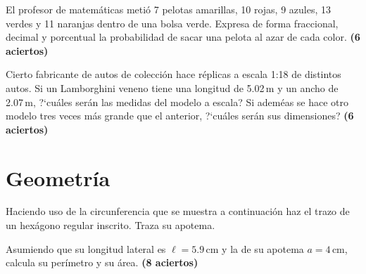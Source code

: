 \documentclass[11pt]{article}
\begin{document}
\vspace{3mm}

\newpage
\vspace{3mm}
El profesor de matem\'aticas meti\'o 7 pelotas amarillas, 10 rojas, 9 azules,
13 verdes y 11 naranjas dentro de una bolsa verde. Expresa de forma
fraccional, decimal y porcentual la probabilidad de sacar una pelota al azar de
cada color.
\hfill \textbf{(6 aciertos)}

\vspace{5cm}
Cierto fabricante de autos de colecci\'on hace r\'eplicas a escala 1:18 de
distintos autos. Si un Lamborghini veneno tiene una longitud de 5.02\,m y un
ancho de 2.07\,m, ?`cu\'ales ser\'an las medidas del modelo a escala? Si
adem\'eas se hace otro modelo tres veces m\'as grande que el anterior,
?`cu\'ales ser\'an sus dimensiones?
\hfill \textbf{(6 aciertos)}


\vspace{4cm}
\section{Geometr\'ia}
Haciendo uso de la circunferencia que se muestra a continuaci\'on haz el trazo
de un hex\'agono regular inscrito. Traza su apotema. 

Asumiendo que su longitud lateral
es $\ell=5.9$\,cm y la de su apotema $a=4$\,cm, calcula su per\'imetro y su
\'area. \hfill \textbf{(8 aciertos)}

\vspace{3mm}
\end{document}
